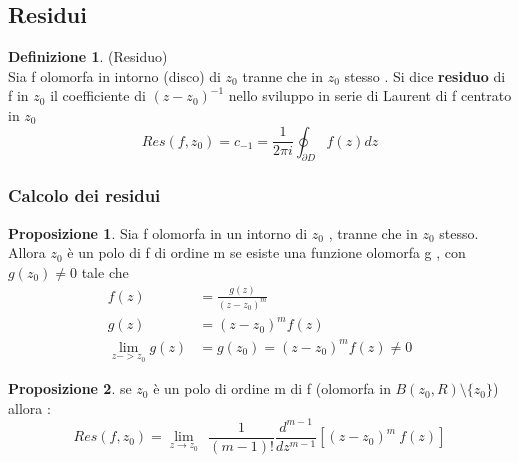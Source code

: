 \documentclass{article}
\theoremstyle{definition}
\newtheorem*{definizione}{Definizione}
\newtheorem*{proposizione}{Proposizione}
\begin{document}
\subsection{Residui}
\begin{definizione}(Residuo) \\
	Sia f olomorfa in intorno (disco) di $z_0$ tranne che in $z_0$ stesso . Si dice \textbf{residuo} di f in $z_0$ il coefficiente di $(z-z_0)^{-1}$ nello sviluppo in serie di Laurent di f centrato in $z_0$ 
	$$Res(f,z_0)=c_{-1}=\frac{1}{2 \pi i}\oint_{\partial D}f(z)dz$$
\end{definizione}
	\subsubsection{Calcolo dei residui}
	\begin{tcolorbox}
	\begin{proposizione}
		Sia f olomorfa in un intorno di $z_0$ , tranne che in $z_0$ stesso. Allora $z_0$ è un polo di f di ordine m se esiste una funzione olomorfa g , con $g(z_0)\neq 0$ tale che 
		\begin{align*}
		f(z)&=\frac{g(z)}{(z-z_0)^m} \\
		g(z)&=(z-z_0)^m f(z) \\
		\lim_{z->z_0}g(z)&=g(z_0)=(z-z_0)^mf(z)\neq 0 
	\end{align*}
	\end{proposizione}
\end{tcolorbox}
	\begin{proposizione}
		\item se $z_0$ è un polo di ordine m di f (olomorfa in $B(z_0,R)\setminus \{z_0\}$) allora :  $$Res(f,z_0)=\lim_{z\rightarrow z_0}\ \ \frac{1}{(m-1)!}\frac{d^{m-1}}{dz^{m-1}}\left[(z-z_0)^m \ f(z)\right]$$
	\end{proposizione}
\end{document}
